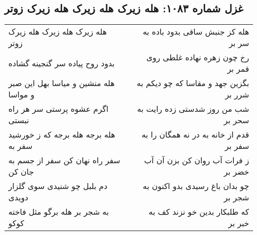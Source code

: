 \begin{center}
\section*{غزل شماره ۱۰۸۳: هله زیرک هله زیرک هله زیرک زوتر}
\label{sec:1083}
\begin{longtable}{l p{0.5cm} r}
هله زیرک هله زیرک هله زیرک زوتر
&&
هله کز جنبش ساقی بدود باده به سر بر
\\
بدود روح پیاده سر گنجینه گشاده
&&
رخ چون زهره نهاده غلطی روی قمر بر
\\
هله منشین و میاسا بهل این صبر و مواسا
&&
بگزین جهد و مقاسا که چو دیکم به شرر بر
\\
اگرم عشوه پرستی سر هر راه نبستی
&&
شب من روز شدستی زده رایت به سحر بر
\\
هله برجه هله برجه که ز خورشید سفر به
&&
قدم از خانه به در نه همگان را به سفر بر
\\
سفر راه نهان کن سفر از جسم به جان کن
&&
ز فرات آب روان کن بزن آن آب خضر بر
\\
دم بلبل چو شنیدی سوی گلزار دویدی
&&
چو بدان باغ رسیدی بدو اکنون به شجر بر
\\
به شجر بر هله برگو مثل فاخته کوکو
&&
که طلبکار بدین خو نزند کف به خبر بر
\\
\end{longtable}
\end{center}
